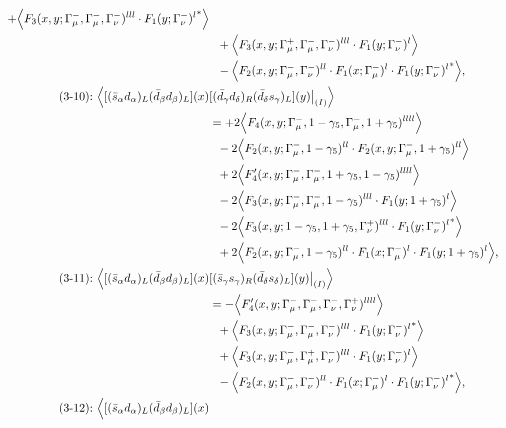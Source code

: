 \begin{align}
 + \Big\langle F_3(x,y;\Gamma_\mu^-,\Gamma_\mu^-,\Gamma_\nu^-)^{lll} \cdot {F_1(y;\Gamma_\nu^-)^l}^*\Big\rangle
\notag\\*&\ \ 
 + \Big\langle F_3(x,y;\Gamma_\mu^+,\Gamma_\mu^-,\Gamma_\nu^-)^{lll} \cdot F_1(y;\Gamma_\nu^-)^l\Big\rangle
\notag\\*&\ \ 
 - \Big\langle F_2(x,y;\Gamma_\mu^-,\Gamma_\nu^-)^{ll} \cdot F_1(x;\Gamma_\mu^-)^l \cdot {F_1(y;\Gamma_\nu^-)^l}^*\Big\rangle,
\\
\mbox{(3-10):}\ 
\Big\langle
[(\bar s_\alpha d_\alpha)_L(\bar d_\beta d_\beta)_L](x)&
[(\bar d_\gamma d_\delta)_R(\bar d_\delta s_\gamma)_L](y)\big|_{(I)}
\Big\rangle
\notag\\*
&=
 + 2\Big\langle F_4(x,y;\Gamma_\mu^-,1-\gamma_5,\Gamma_\mu^-,1+\gamma_5)^{llll}\Big\rangle
\notag\\*&\ \ 
-2\Big\langle F_2(x,y;\Gamma_\mu^-,1-\gamma_5)^{ll} \cdot F_2(x,y;\Gamma_\mu^-,1+\gamma_5)^{ll}\Big\rangle
\notag\\*&\ \ 
 + 2\Big\langle F_4'(x,y;\Gamma_\mu^-,\Gamma_\mu^-,1+\gamma_5,1-\gamma_5)^{llll}\Big\rangle
\notag\\*&\ \ 
-2\Big\langle F_3(x,y;\Gamma_\mu^-,\Gamma_\mu^-,1-\gamma_5)^{lll} \cdot F_1(y;1+\gamma_5)^l\Big\rangle
\notag\\*&\ \ 
-2\Big\langle F_3(x,y;1-\gamma_5,1+\gamma_5,\Gamma_\nu^+)^{lll} \cdot {F_1(y;\Gamma_\nu^-)^l}^*\Big\rangle
\notag\\*&\ \ 
 + 2\Big\langle F_2(x,y;\Gamma_\mu^-,1-\gamma_5)^{ll} \cdot F_1(x;\Gamma_\mu^-)^l \cdot F_1(y;1+\gamma_5)^l\Big\rangle,
\\
\mbox{(3-11):}\ 
\Big\langle
[(\bar s_\alpha d_\alpha)_L(\bar d_\beta d_\beta)_L](x)&
[(\bar s_\gamma s_\gamma)_R(\bar d_\delta s_\delta)_L](y)\big|_{(I)}
\Big\rangle
\notag\\*
&=
 - \Big\langle F_4'(x,y;\Gamma_\mu^-,\Gamma_\mu^-,\Gamma_\nu^-,\Gamma_\nu^+)^{llll}\Big\rangle
\notag\\*&\ \ 
 + \Big\langle F_3(x,y;\Gamma_\mu^-,\Gamma_\mu^-,\Gamma_\nu^-)^{lll} \cdot {F_1(y;\Gamma_\nu^-)^l}^*\Big\rangle
\notag\\*&\ \ 
 + \Big\langle F_3(x,y;\Gamma_\mu^-,\Gamma_\mu^+,\Gamma_\nu^-)^{lll} \cdot F_1(y;\Gamma_\nu^-)^l\Big\rangle
\notag\\*&\ \ 
 - \Big\langle F_2(x,y;\Gamma_\mu^-,\Gamma_\nu^-)^{ll} \cdot F_1(x;\Gamma_\mu^-)^l \cdot {F_1(y;\Gamma_\nu^-)^l}^*\Big\rangle,
\\
\mbox{(3-12):}\ 
\Big\langle
[(\bar s_\alpha d_\alpha)_L(\bar d_\beta d_\beta)_L](x)&

\end{align}
